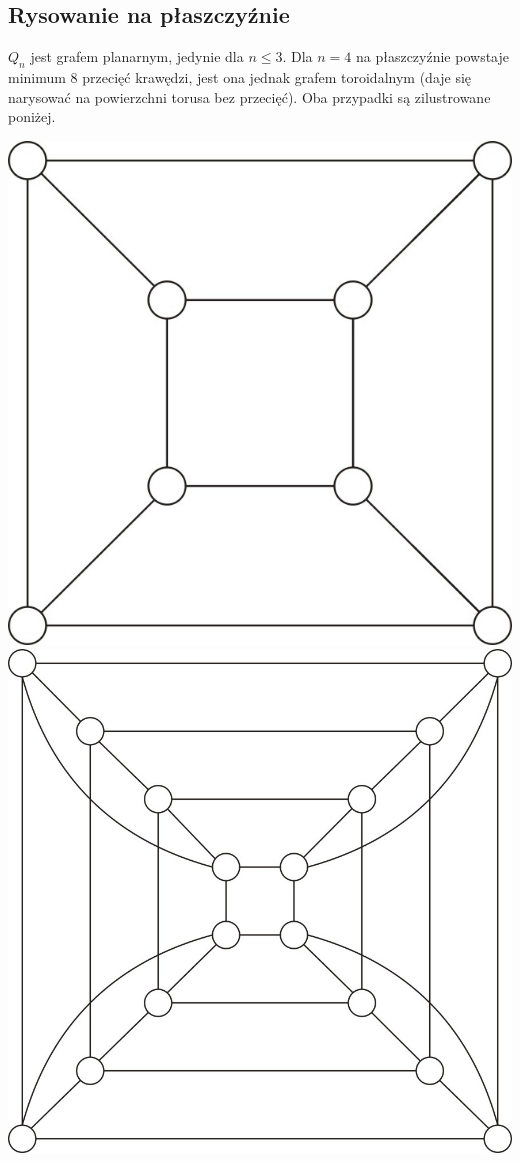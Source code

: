 \documentclass{pracamgr}
\begin{document}
   \subsection{Rysowanie na płaszczyźnie}
   $Q_n$ jest grafem planarnym, jedynie dla $n\le3$.\newline
   Dla $n=4$ na płaszczyźnie powstaje minimum $8$ przecięć krawędzi,
   jest ona jednak grafem toroidalnym (daje się narysować na powierzchni torusa bez przecięć). Oba przypadki są zilustrowane poniżej.
   \begin{center}
    \includegraphics[scale=0.6]{img/Q3_planar.jpg}\includegraphics[scale=0.6]{img/Q4_not_planar.jpg}
   \end{center}
\end{document}
